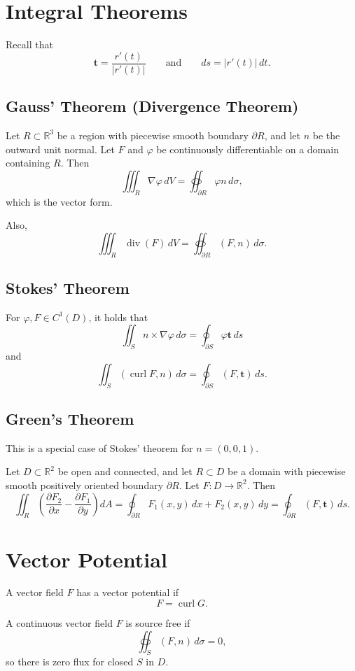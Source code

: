 \documentclass[11pt]{report}
\theoremstyle{definition}
\theoremstyle{plain}
\theoremstyle{remark}
\newcommand{\R}{\mathbb{R}}
\newcommand{\ip}[2]{\left(#1,#2\right)}
\newcommand{\grad}{\nabla}
\newcommand{\divergence}{\operatorname{div}}
\newcommand{\curl}{\operatorname{curl}}
\newcommand{\ut}{\mathbf{t}}
\begin{document}
\section{Integral Theorems}

Recall that
\[
\ut=\frac{r'(t)}{|r'(t)|}
\qquad \text{and} \qquad
ds=|r'(t)|\,dt.
\]

\subsection{Gauss' Theorem (Divergence Theorem)}

Let $R\subset \R^3$ be a region with piecewise smooth boundary $\partial R$, and let $n$ be the outward unit normal. Let $F$ and $\varphi$ be continuously differentiable on a domain containing $R$. Then
\[
\iiint_R \grad\varphi\,dV = \oiint_{\partial R} \varphi n\,d\sigma,
\]
which is the vector form.

Also,
\[
\iiint_R \divergence(F)\,dV = \oiint_{\partial R} \ip{F}{n}\,d\sigma.
\]

\subsection{Stokes' Theorem}

For $\varphi,F\in C^1(D)$, it holds that
\[
\iint_S n\times \grad\varphi\,d\sigma = \oint_{\partial S} \varphi \ut\,ds
\]
and
\[
\iint_S \ip{\curl F}{n}\,d\sigma = \oint_{\partial S} \ip{F}{\ut}\,ds.
\]

\subsection{Green's Theorem}

This is a special case of Stokes' theorem for $n=(0,0,1)$.

Let $D\subset \R^2$ be open and connected, and let $R\subset D$ be a domain with piecewise smooth positively oriented boundary $\partial R$. Let $F:D\to \R^2$. Then
\[
\iint_R\left(\frac{\partial F_2}{\partial x}-\frac{\partial F_1}{\partial y}\right)dA
= \oint_{\partial R} F_1(x,y)\,dx + F_2(x,y)\,dy
= \oint_{\partial R}\ip{F}{\ut}\,ds.
\]

\section{Vector Potential}

A vector field $F$ has a vector potential if
\[
F=\curl G.
\]

A continuous vector field $F$ is source free if
\[
\oiint_S \ip{F}{n}\,d\sigma=0,
\]
so there is zero flux for closed $S$ in $D$.
\end{document}
